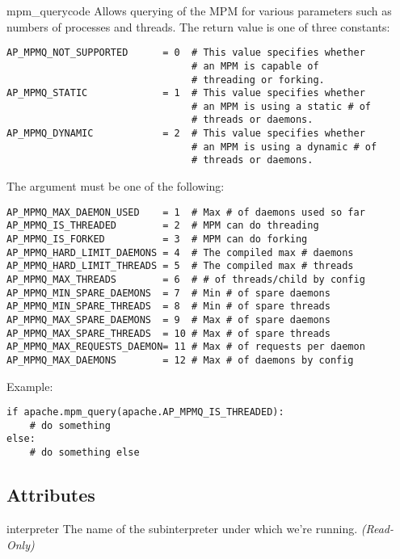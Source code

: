 \begin{funcdesc}{mpm_query}{code}
  Allows querying of the MPM for various parameters such as numbers of
  processes and threads. The return value is one of three constants:
  \begin{verbatim}
AP_MPMQ_NOT_SUPPORTED      = 0  # This value specifies whether 
                                # an MPM is capable of         
                                # threading or forking.        
AP_MPMQ_STATIC             = 1  # This value specifies whether 
                                # an MPM is using a static # of
                                # threads or daemons.          
AP_MPMQ_DYNAMIC            = 2  # This value specifies whether 
                                # an MPM is using a dynamic # of
                                # threads or daemons.          
  \end{verbatim}

  The  argument must be one of the following:
  \begin{verbatim}
AP_MPMQ_MAX_DAEMON_USED    = 1  # Max # of daemons used so far 
AP_MPMQ_IS_THREADED        = 2  # MPM can do threading         
AP_MPMQ_IS_FORKED          = 3  # MPM can do forking           
AP_MPMQ_HARD_LIMIT_DAEMONS = 4  # The compiled max # daemons   
AP_MPMQ_HARD_LIMIT_THREADS = 5  # The compiled max # threads   
AP_MPMQ_MAX_THREADS        = 6  # # of threads/child by config 
AP_MPMQ_MIN_SPARE_DAEMONS  = 7  # Min # of spare daemons       
AP_MPMQ_MIN_SPARE_THREADS  = 8  # Min # of spare threads       
AP_MPMQ_MAX_SPARE_DAEMONS  = 9  # Max # of spare daemons       
AP_MPMQ_MAX_SPARE_THREADS  = 10 # Max # of spare threads       
AP_MPMQ_MAX_REQUESTS_DAEMON= 11 # Max # of requests per daemon 
AP_MPMQ_MAX_DAEMONS        = 12 # Max # of daemons by config   
  \end{verbatim}

Example:
  \begin{verbatim}
if apache.mpm_query(apache.AP_MPMQ_IS_THREADED):
    # do something
else:
    # do something else
  \end{verbatim}
\end{funcdesc}

\subsection{Attributes\label{pyapi-apmem}}

\begin{memberdesc}[apache]{interpreter}
  The name of the subinterpreter under which we're running.
  \emph{(Read-Only)}
\end{memberdesc}

